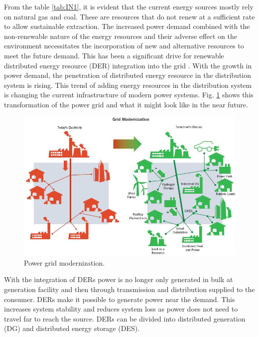 From the table \ref{tab:IN1}, it is evident that the current energy sources mostly rely on natural gas and coal. These are resources that do not renew at a sufficient rate to allow sustainable extraction. The increased power demand combined with the non-renewable nature of the energy resources and their adverse effect on the environment necessitates the incorporation of new and alternative resources to meet the future demand. This has been a significant drive for renewable distributed energy resource (DER) integration into the grid \cite{khan2009review,bignucolo2008radial,series2009microgrids}. With the growth in power demand, the penetration of distributed energy resource in the distribution system is rising. This trend of adding energy resources in the distribution system is changing the current infrastructure of modern power systems. Fig. \ref{fig:NEW_GRID} shows this transformation of the power grid and what it might look like in the near future. 

\begin{figure}[!h]
\centering
\includegraphics[width=0.85\linewidth]{figs/NEW_GRID.png}
\caption[Power grid modernization.]{Power grid modernization.\cite{NEW_GRID}}
\label{fig:NEW_GRID}
\end{figure}

With the integration of DERs power is no longer only generated in bulk at generation facility and then through transmission and distribution supplied to the consumer. DERs make it possible to generate power near the demand. This increases system stability and reduces system loss as power does not need to travel far to reach the source. DERs can be divided into distributed generation (DG) and distributed energy storage (DES). 

